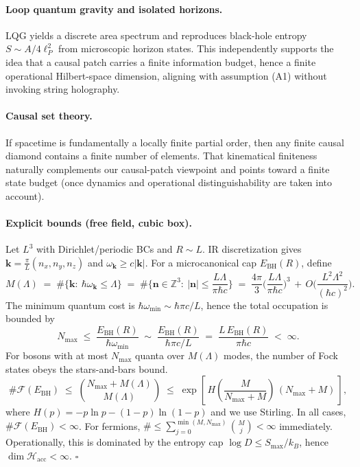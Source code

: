 \documentclass[12pt]{article}
\theoremstyle{remark}
\begin{document}
\paragraph{Loop quantum gravity and isolated horizons.}
LQG yields a discrete area spectrum and reproduces black-hole entropy $S\!\sim\!A/4\ell_P^2$ from microscopic horizon states. This independently supports the idea that a causal patch carries a finite information budget, hence a finite operational Hilbert-space dimension, aligning with assumption (A1) without invoking string holography.

\paragraph{Causal set theory.}
If spacetime is fundamentally a locally finite partial order, then any finite causal diamond contains a finite number of elements. That kinematical finiteness naturally complements our causal-patch viewpoint and points toward a finite state budget (once dynamics and operational distinguishability are taken into account).

\paragraph{Explicit bounds (free field, cubic box).}
Let $L^3$ with Dirichlet/periodic BCs and $R\sim L$. IR discretization gives 
$\mathbf{k}=\frac{\pi}{L}(n_x,n_y,n_z)$ and $\omega_{\mathbf{k}}\ge c|\mathbf{k}|$.
For a microcanonical cap $E_{\mathrm{BH}}(R)$, define 
\[
M(\Lambda)\;=\;\#\{\mathbf{k}:\ \hbar\omega_{\mathbf{k}}\le \Lambda\}
\;=\;\#\Big\{\mathbf{n}\in\mathbb{Z}^3:\ |\mathbf{n}|\le \frac{L\Lambda}{\pi\hbar c}\Big\}
\;=\;\frac{4\pi}{3}\Big(\frac{L\Lambda}{\pi\hbar c}\Big)^3 \,+\,O\Big(\frac{L^2\Lambda^2}{(\hbar c)^2}\Big).
\]
The minimum quantum cost is $\hbar\omega_{\min}\sim \hbar\pi c/L$, hence the total occupation is bounded by
\[
N_{\max}\;\le\;\frac{E_{\mathrm{BH}}(R)}{\hbar\omega_{\min}}
\;\sim\;\frac{E_{\mathrm{BH}}(R)}{\hbar\pi c/L}
\;=\;\frac{L\,E_{\mathrm{BH}}(R)}{\pi\hbar c}\;<\;\infty.
\]
For bosons with at most $N_{\max}$ quanta over $M(\Lambda)$ modes, the number of Fock states obeys the stars-and-bars bound.
\[
\#\mathcal{F}(E_{\mathrm{BH}})\;\le\;\binom{N_{\max}+M(\Lambda)}{M(\Lambda)}
\;\le\;\exp\!\left[\,H\!\left(\frac{M}{N_{\max}+M}\right)\,(N_{\max}+M)\,\right],
\]
where $H(p)=-p\ln p-(1-p)\ln(1-p)$ and we use Stirling. In all cases, $\#\mathcal{F}(E_{\mathrm{BH}})<\infty$.
For fermions, $\#\le \sum_{j=0}^{\min(M,N_{\max})}\binom{M}{j}<\infty$ immediately.
Operationally, this is dominated by the entropy cap $\log D\le S_{\max}/k_B$, hence $\dim\mathcal{H}_{\mathrm{acc}}<\infty$.
\hfill$\square$
\end{document}
